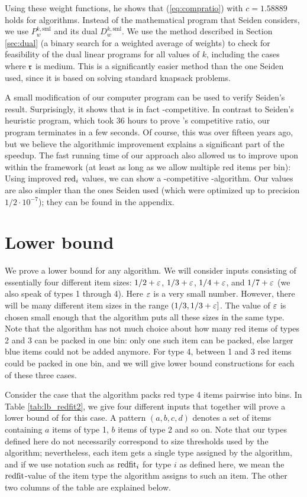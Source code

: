 Using these weight functions, he shows that (\ref{eq:compratio}) with $c=1.58889$ holds for
\SuperH{} algorithms. Instead of the mathematical program that Seiden considers,
we use $P^{k,\text{sml}}_w$ and its dual $D^{k,\text{sml}}_w$.
We use the method described in Section \ref{sec:dual} (a binary search for a weighted average of weights)
to check for feasibility of the dual linear programs for all values of $k$, including the cases where {$\mathfrak{r}$  is medium}.
This is a significantly easier method than the one Seiden used, since it is based on solving standard knapsack problems.

A small modification of our computer program can be used to verify Seiden's result. Surprisingly, it shows that {\Hpp} is in fact \superhratio-competitive. In contrast to Seiden's heuristic program, which took 36 hours to prove {\Hpp}'s competitive ratio, our program terminates in a few seconds. Of course, this was over fifteen years ago, but we believe the algorithmic improvement explains a significant part of the speedup.
The fast running time of our approach also allowed us to improve upon {\Hpp} within the {\SuperH} framework (at least as long as we allow multiple red items per bin): Using improved $\mathrm{red}_i$ values, we can show a \newsuperhratio-competitive {\SuperH}-algorithm. Our values are also simpler than the ones Seiden used (which were optimized up to precision $1/2\cdot 10^{-7}$); they can be found in the appendix.

\section{Lower bound}
We prove a lower bound for any \EHarm{} algorithm.
We will consider inputs consisting of essentially four different item sizes: $1/2+\varepsilon$, $1/3+\varepsilon$, $1/4+\varepsilon$, and $1/7+\varepsilon$ (we also speak of types 1 through 4). Here $\varepsilon$ is a very small number. However, there will be many different item sizes in the range
$(1/3,1/3+\varepsilon]$.
The value of $\varepsilon$ is chosen small enough that the algorithm puts all these sizes in the same type.
Note that the algorithm has not much choice about how many red items of types 2 and 3 can be packed in one bin: only one such item can be packed, else larger blue items could not be added anymore. For type 4, between 1 and 3 red items could be packed in one bin, and we will give lower bound constructions for each of these three cases.

Consider the case that the algorithm packs red type 4 items pairwise into bins. In Table \ref{tab:lb_redfit2}, we give four different inputs that together will prove a lower bound of \finallb{} for this case. A pattern $(a,b,c,d)$ denotes a set of items containing $a$ items of type 1, $b$ items of type 2 and so on. 
Note that our types defined here do not necessarily correspond to size thresholds used by the algorithm; nevertheless, each item gets a single type assigned by the algorithm, and if we use notation such as $\mathrm{redfit}_i$ for type $i$ as defined here, we mean the $\mathrm{redfit}$-value of the item type the algorithm assigns to such an item.
The other two columns of the table are explained below.

